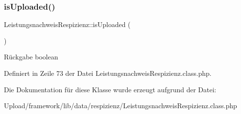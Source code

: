\subsubsection{\texorpdfstring{is\+Uploaded()}{isUploaded()}}
{\footnotesize\ttfamily Leistungsnachweis\+Respizienz\+::is\+Uploaded (\begin{DoxyParamCaption}{ }\end{DoxyParamCaption})}

\begin{DoxyReturn}{Rückgabe}
boolean 
\end{DoxyReturn}


Definiert in Zeile 73 der Datei Leistungsnachweis\+Respizienz.\+class.\+php.



Die Dokumentation für diese Klasse wurde erzeugt aufgrund der Datei\+:\begin{DoxyCompactItemize}
\item 
Upload/framework/lib/data/respizienz/Leistungsnachweis\+Respizienz.\+class.\+php\end{DoxyCompactItemize}
